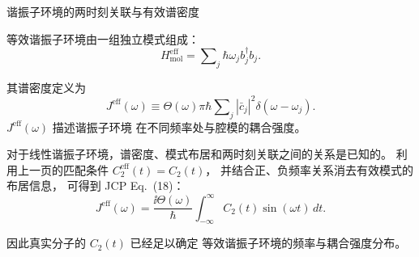 \begin{frame}{谐振子环境的两时刻关联与有效谱密度}

  \footnotesize
  \setlength{\abovedisplayskip}{3pt}
  \setlength{\belowdisplayskip}{3pt}

  \vspace*{0.4em}
  等效谐振子环境由一组独立模式组成：
  {\fontsize{10.95}{13}\selectfont
  \[
    H_{\mathrm{mol}}^{\mathrm{eff}}
      =\sum\nolimits_j\hbar\omega_j b_j^\dagger b_j .
  \]}

  其谱密度定义为
  {\fontsize{10.95}{13}\selectfont
  \[
    J^{\mathrm{eff}}(\omega)
      \equiv\Theta(\omega)\pi\hbar
      \sum\nolimits_j|\bar c_j|^2\delta(\omega-\omega_j).
  \]}
  $J^{\mathrm{eff}}(\omega)$ 描述谐振子环境
  在不同频率处与腔模的耦合强度。

  \vspace{0.5em}
  对于线性谐振子环境，谱密度、模式布居和两时刻关联之间的关系是已知的。
  利用上一页的匹配条件 $C_2^{\mathrm{eff}}(t)=C_2(t)$，
  并结合正、负频率关系消去有效模式的布居信息，
  可得到 JCP Eq.~(18)：
  {\fontsize{10.95}{13}\selectfont
  \[
    J^{\mathrm{eff}}(\omega)
      =\frac{\ii\Theta(\omega)}{\hbar}
        \int_{-\infty}^{\infty}C_2(t)\sin(\omega t)\,dt.
  \]}

  因此真实分子的 $C_2(t)$ 已经足以确定
  等效谐振子环境的频率与耦合强度分布。


\end{frame}


